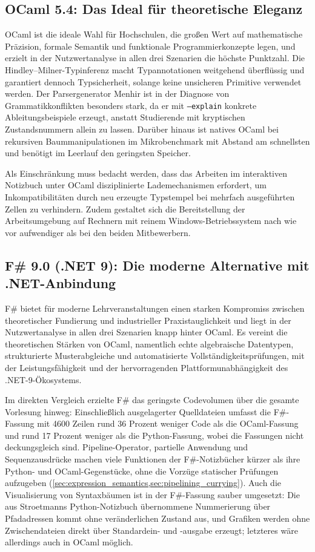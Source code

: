 \subsection{OCaml 5.4: Das Ideal für theoretische Eleganz}
OCaml ist die ideale Wahl für Hochschulen, die großen Wert auf mathematische Präzision, formale Semantik und funktionale Programmierkonzepte legen, und erzielt in der Nutzwertanalyse in allen drei Szenarien die höchste Punktzahl.
Die Hindley--Milner-Typinferenz macht Typannotationen weitgehend überflüssig und garantiert dennoch Typsicherheit, solange keine unsicheren Primitive verwendet werden.
Der Parsergenerator Menhir ist in der Diagnose von Grammatikkonflikten besonders stark, da er mit \texttt{--explain} konkrete Ableitungsbeispiele erzeugt, anstatt Studierende mit kryptischen Zustandsnummern allein zu lassen.
Darüber hinaus ist natives OCaml bei rekursiven Baummanipulationen im Mikrobenchmark mit Abstand am schnellsten und benötigt im Leerlauf den geringsten Speicher.

Als Einschränkung muss bedacht werden, dass das Arbeiten im interaktiven Notizbuch unter OCaml disziplinierte Lademechanismen erfordert, um Inkompatibilitäten durch neu erzeugte Typstempel bei mehrfach ausgeführten Zellen zu verhindern.
Zudem gestaltet sich die Bereitstellung der Arbeitsumgebung auf Rechnern mit reinem Windows-Betriebssystem nach wie vor aufwendiger als bei den beiden Mitbewerbern.

\subsection{F\# 9.0 (.NET 9): Die moderne Alternative mit .NET-Anbindung}
F\# bietet für moderne Lehrveranstaltungen einen starken Kompromiss zwischen theoretischer Fundierung und industrieller Praxistauglichkeit und liegt in der Nutzwertanalyse in allen drei Szenarien knapp hinter OCaml.
Es vereint die theoretischen Stärken von OCaml, namentlich echte algebraische Datentypen, strukturierte Musterabgleiche und automatisierte Vollständigkeitsprüfungen, mit der Leistungsfähigkeit und der hervorragenden Plattformunabhängigkeit des .NET-9-Ökosystems.

Im direkten Vergleich erzielte F\# das geringste Codevolumen über die gesamte Vorlesung hinweg: Einschließlich ausgelagerter Quelldateien umfasst die F\#-Fassung mit 4600 Zeilen rund 36 Prozent weniger Code als die OCaml-Fassung und rund 17 Prozent weniger als die Python-Fassung, wobei die Fassungen nicht deckungsgleich sind.
Pipeline-Operator, partielle Anwendung und Sequenzausdrücke machen viele Funktionen der F\#-Notizbücher kürzer als ihre Python- und OCaml-Gegenstücke, ohne die Vorzüge statischer Prüfungen aufzugeben (\cref{sec:expression_semantics,sec:pipelining_currying}).
Auch die Visualisierung von Syntaxbäumen ist in der F\#-Fassung sauber umgesetzt: Die aus Stroetmanns Python-Notizbuch übernommene Nummerierung über Pfadadressen kommt ohne veränderlichen Zustand aus, und Grafiken werden ohne Zwischendateien direkt über Standardein- und -ausgabe erzeugt; letzteres wäre allerdings auch in OCaml möglich.

